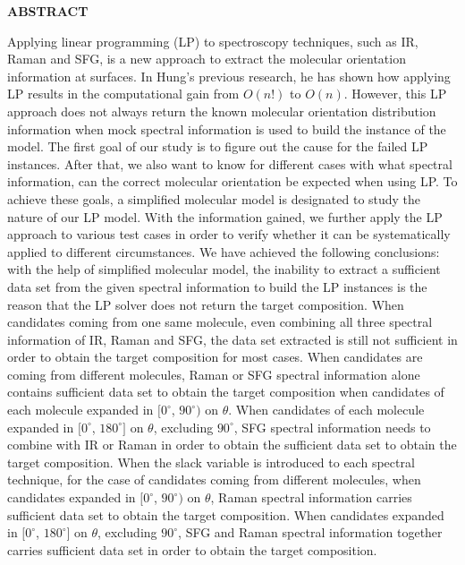 \newpage
{}

\begin{center}
\textbf{ABSTRACT}
\end{center}


Applying linear programming (LP) to spectroscopy techniques, such as IR, Raman and SFG, is a new approach to extract the molecular orientation information at surfaces. In Hung's previous research, he has shown how applying LP results in the computational gain from $O(n!)$ to $O(n)$. However, this LP approach does not always return the known molecular orientation distribution information when mock spectral information is used to build the instance of the model. The first goal of our study is to figure out the cause for the failed LP instances. After that, we also want to know for different cases with what spectral information, can the correct molecular orientation be expected when using LP. To achieve these goals, a simplified molecular model is designated to study the nature of our LP model. With the information gained, we further apply the LP approach to various test cases in order to verify whether it can be systematically applied to different circumstances. We have achieved the following conclusions: with the help of simplified molecular model, the inability to extract a sufficient data set from the given spectral information to build the LP instances is the reason that the LP solver does not return the target composition. When candidates coming from one same molecule, even combining all three spectral information of IR, Raman and SFG, the data set extracted is still not sufficient in order to obtain the target composition for most cases. When candidates are coming from different molecules, Raman or SFG spectral information alone contains sufficient data set to obtain the target composition when candidates of each molecule expanded in $[0^{\circ}$, $90^{\circ})$ on $\theta$. When candidates of each molecule expanded in $[0^{\circ}$, $180^{\circ}]$ on $\theta$, excluding $90^{\circ}$, SFG spectral information needs to combine with IR or Raman in order to obtain the sufficient data set to obtain the target composition. When the slack variable is introduced to each spectral technique, for the case of candidates coming from different molecules, when candidates expanded in $[0^{\circ}$, $90^{\circ})$ on $\theta$, Raman spectral information carries sufficient data set to obtain the target composition. When candidates expanded in $[0^{\circ}$, $180^{\circ}]$ on $\theta$, excluding $90^{\circ}$, SFG and Raman spectral information together carries sufficient data set in order to obtain the target composition.